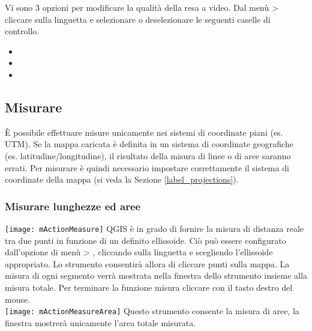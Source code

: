 \label{label_renderquality}

Vi sono 3 opzioni per modificare la qualità della resa a video. Dal menù
 >  cliccare sulla linguetta
 e selezionare o deselezionare le seguenti caselle di controllo.
\begin{itemize}
\item {}
\item {}
\item {}
\end{itemize}


\subsection{Misurare}\label{sec:measure}

È possibile effettuare misure unicamente nei sistemi di coordinate piani
(es. UTM). Se la mappa caricata è definita in un sistema di coordinate
geografiche (es. latitudine/longitudine), il risultato della misura di linee o
di aree saranno errati. Per misurare è quindi necessario impostare
correttamente il sistema di coordinate della mappa (si veda la Sezione \ref{label_projections}).

\subsubsection{Misurare lunghezze ed aree}
\texttt{[image: mActionMeasure]} 
QGIS è in grado di fornire la misura di distanza reale tra due punti in
funzione di un definito ellissoide. Ciò può essere configurato dall'opzione di
menù  > , 
cliccando sulla linguetta  e scegliendo l'ellissoide
appropriato. Lo strumento consentirà allora di cliccare punti sulla mappa.
La misura di ogni segmento verrà mostrata nella finestra dello strumento
insieme alla misura totale. Per terminare la funzione misura cliccare con il
tasto destro del mouse. \\
\texttt{[image: mActionMeasureArea]} Questo strumento consente la
misura di aree, la finestra mostrerà unicamente l'area totale misurata.

